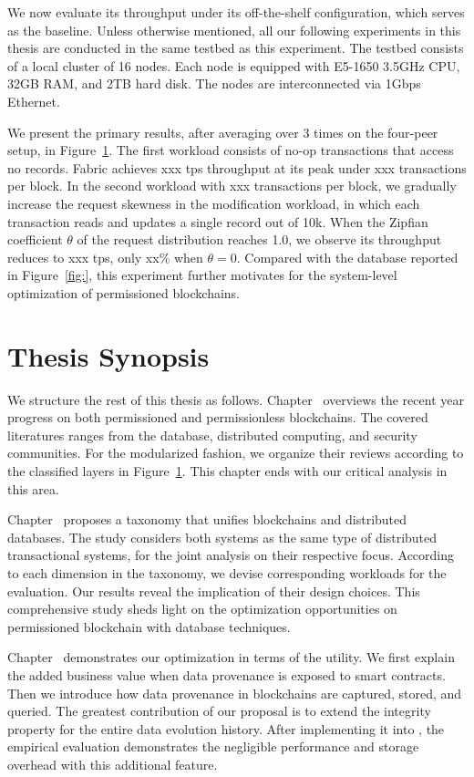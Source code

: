 We now evaluate its throughput under its off-the-shelf configuration, which serves as the baseline. 
Unless otherwise mentioned, all our following experiments in this thesis are conducted in the same testbed as this experiment.
The testbed consists of a local cluster of 16 nodes. Each node is equipped with E5-1650 3.5GHz CPU, 32GB RAM, and 2TB hard disk. The nodes are interconnected via 1Gbps Ethernet. 

We present the primary results, after averaging over 3 times on the four-peer setup, in Figure~\ref{}. 
The first workload consists of no-op transactions that access no records. 
Fabric achieves xxx tps throughput at its peak under xxx transactions per block. 
In the second workload with xxx transactions per block, we gradually increase the request skewness in the modification workload, in which each transaction reads and updates a single record out of 10k. 
When the Zipfian coefficient $\theta$ of the request distribution reaches 1.0, we observe its throughput reduces to xxx tps, only xx\% when $\theta=0$. 
Compared with the database reported in Figure~\ref{fig:}, this experiment further motivates for the system-level optimization of permissioned blockchains. 

\section{Thesis Synopsis}
We structure the rest of this thesis as follows. Chapter~\cite{ch:literature} overviews the recent year progress on both permissioned and permissionless blockchains. The covered literatures ranges from the database, distributed computing, and security communities. For the modularized fashion, we organize their reviews according to the classified layers in Figure~\ref{}. This chapter ends with our critical analysis in this area. 

Chapter~\cite{ch:twin} proposes a taxonomy that unifies blockchains and distributed databases. 
The study considers both systems as the same type of distributed transactional systems, for the joint analysis on their respective focus. 
According to each dimension in the taxonomy, we devise corresponding workloads for the evaluation. 
Our results reveal the implication of their design choices. 
This comprehensive study sheds light on the optimization opportunities on permissioned blockchain with database techniques. 

Chapter~\cite{ch:prov} demonstrates our optimization in terms of the utility. 
We first explain the added business value when data provenance is exposed to smart contracts. 
Then we introduce how data provenance in blockchains are captured, stored, and queried. 
The greatest contribution of our proposal is to extend the integrity property for the entire data evolution history. 
After implementing it into {\fs}, the empirical evaluation demonstrates the negligible performance and storage overhead with this additional feature. 

